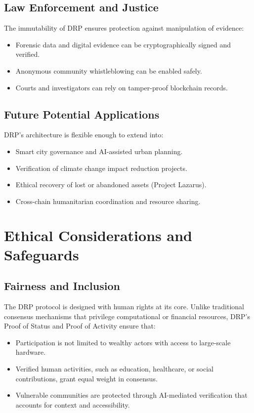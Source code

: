 \documentclass[11pt,a4paper]{article}
\begin{document}
\subsection{Law Enforcement and Justice}
The immutability of DRP ensures protection against manipulation of evidence:
\begin{itemize}
    \item Forensic data and digital evidence can be cryptographically signed and verified.
    \item Anonymous community whistleblowing can be enabled safely.
    \item Courts and investigators can rely on tamper-proof blockchain records.
\end{itemize}

\subsection{Future Potential Applications}
DRP’s architecture is flexible enough to extend into:
\begin{itemize}
    \item Smart city governance and AI-assisted urban planning.
    \item Verification of climate change impact reduction projects.
    \item Ethical recovery of lost or abandoned assets (Project Lazarus).
    \item Cross-chain humanitarian coordination and resource sharing.
\end{itemize}

\section{Ethical Considerations and Safeguards}

\subsection{Fairness and Inclusion}
The DRP protocol is designed with human rights at its core. Unlike traditional consensus mechanisms that privilege computational or financial resources, DRP’s Proof of Status and Proof of Activity ensure that:
\begin{itemize}
    \item Participation is not limited to wealthy actors with access to large-scale hardware.
    \item Verified human activities, such as education, healthcare, or social contributions, grant equal weight in consensus.
    \item Vulnerable communities are protected through AI-mediated verification that accounts for context and accessibility.
\end{itemize}
\end{document}
